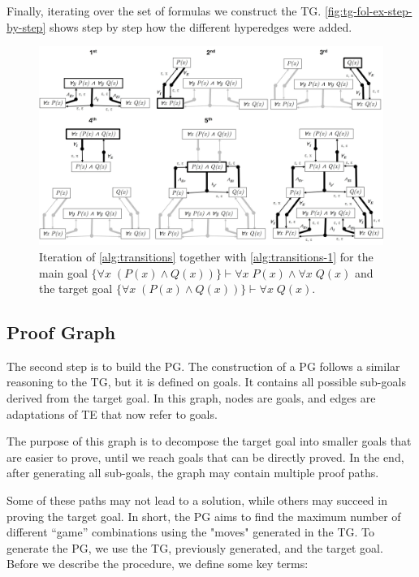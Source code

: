 Finally, iterating over the set of formulas we construct the \gls{TG}. \autoref{fig:tg-fol-ex-step-by-step} shows step by step how the different hyperedges were added.

\begin{figure}[h]
    \centering
    \includegraphics[width=1\linewidth]{Chapters/Figures/tg-fol-ex-step-by-step.jpg}
    \caption{Iteration of \autoref{alg:transitions} together with \autoref{alg:transitions-1} for the main goal \(\{\forall x\;(P(x) \land Q(x))\} \vdash \forall x\;P(x) \land \forall x\;Q(x)\) and the target goal \(\{\forall x\;(P(x) \land Q(x))\} \vdash \forall x\;Q(x)\).}
    \label{fig:tg-fol-ex-step-by-step}
\end{figure}

\subsection{Proof Graph}
The second step is to build the \gls{PG}. The construction of a \gls{PG} follows a similar reasoning to the \gls{TG}, but it is defined on goals. It contains all possible sub-goals derived from the target goal. In this graph, nodes are goals, and edges are adaptations of \gls{TE} that now refer to goals. 

The purpose of this graph is to decompose the target goal into smaller goals that are easier to prove, until we reach goals that can be directly proved. In the end, after generating all sub-goals, the graph may contain multiple proof paths. 

Some of these paths may not lead to a solution, while others may succeed in proving the target goal. In short, the \gls{PG} aims to find the maximum number of different ``game'' combinations using the "moves" generated in the \gls{TG}. To generate the \gls{PG}, we use the \gls{TG}, previously generated, and the target goal. Before we describe the procedure, we define some key terms:

